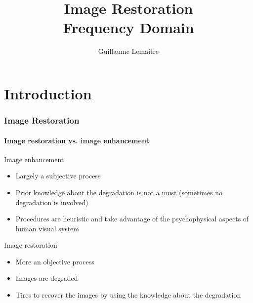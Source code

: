 \documentclass{beamer}
\title{Image Restoration\\
Frequency Domain}
\author{Guillaume Lemaitre}
\institute{Universit\'e de Bourgogne}
\begin{document}
\begin{frame}
  \titlepage
\end{frame}

\begin{frame}
  \tableofcontents[sectionstyle=show,subsectionstyle=show,subsubsectionstyle=hide]
\end{frame}

\section{Introduction}
\begin{frame}
\frametitle{Image Restoration}
\framesubtitle{Image restoration vs. image enhancement}
\begin{block}{Image enhancement}
\begin{itemize}
	\item Largely a subjective process
	\item Prior knowledge about the degradation is not a must (sometimes no degradation is involved)
	\item Procedures are heuristic and take advantage of the psychophysical aspects of human visual system
\end{itemize}
\end{block}
\begin{block}{Image restoration}
\begin{itemize}
	\item More an objective process 
	\item Images are degraded
	\item Tires to recover the images by using the knowledge about the degradation
\end{itemize}
\end{block}
\end{frame}
\end{document}
